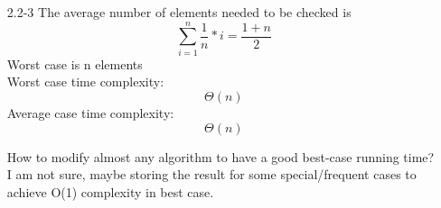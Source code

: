 \documentclass[]{article}
\begin{document}
\begin{enumerate}
\item[2.2-3] The average number of elements needed to be checked is $$ \sum_{i=1}^{n}\frac{1}{n} * i = \frac{1+n}{2} $$
Worst case is n elements\\
Worst case time complexity: $$ \Theta(n) $$
Average case time complexity: $$ \Theta(n) $$

How to modify almost any algorithm to have a good best-case running time?\\
I am not sure, maybe storing the result for some special/frequent cases to achieve O(1) complexity in best case.

\end{enumerate}
\end{document}
